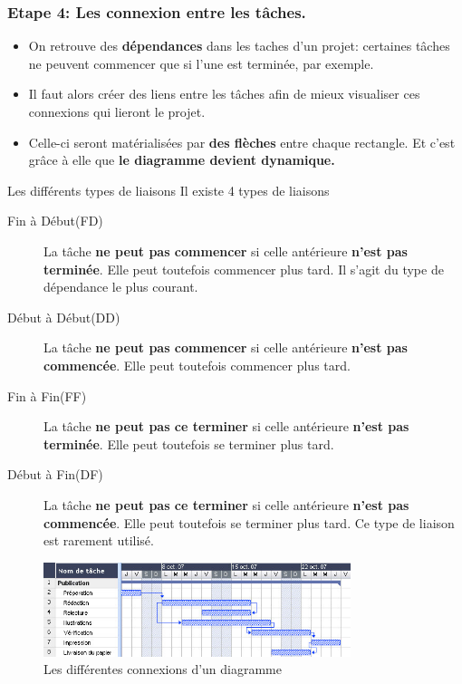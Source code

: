\documentclass{beamer}
\begin{document}
\begin{frame}
  \frametitle{Etape 4: Les connexion entre les tâches.}
  \begin {itemize}
  \item On retrouve des \textbf{dépendances} dans les taches d'un projet: certaines tâches ne peuvent commencer que si l'une est terminée, par exemple.
  \item Il faut alors \alert{créer des liens} entre les tâches afin de \alert{mieux visualiser} ces connexions qui lieront le projet.
  \item Celle-ci seront matérialisées par \textbf{des flèches} entre chaque rectangle. Et c'est grâce à elle que \textbf{le diagramme devient dynamique.}
  \end{itemize}
\end{frame}

\begin{frame}{Les différents types de liaisons}
  Il existe 4 types de liaisons
  \begin{description}
  \item[Fin à Début(FD)] La tâche\textbf{ ne peut pas commencer} si celle antérieure \textbf{n'est pas terminée}. Elle peut toutefois commencer plus tard. Il s'agit du type de dépendance le plus courant.
  \item[Début à Début(DD)] La tâche \textbf{ne peut pas commencer} si celle antérieure \textbf{n'est pas commencée}. Elle peut toutefois commencer plus tard.
  \item[Fin à Fin(FF)]  La tâche\textbf{ ne peut pas ce terminer} si celle antérieure \textbf{n'est pas terminée}. Elle peut toutefois se terminer plus tard.
  \item[Début à Fin(DF)]  La tâche\textbf{ ne peut pas ce terminer} si celle antérieure \textbf{n'est pas commencée}. Elle peut toutefois se terminer plus tard. Ce type de liaison est rarement utilisé.
  \end{description}
\end{frame}


\begin{frame}
  \begin{figure}
    \centering
    \includegraphics[width=0.8\textwidth]{Dfleche}
    \caption{Les différentes connexions d'un diagramme}
  \end{figure}
\end{frame}
\end{document}
